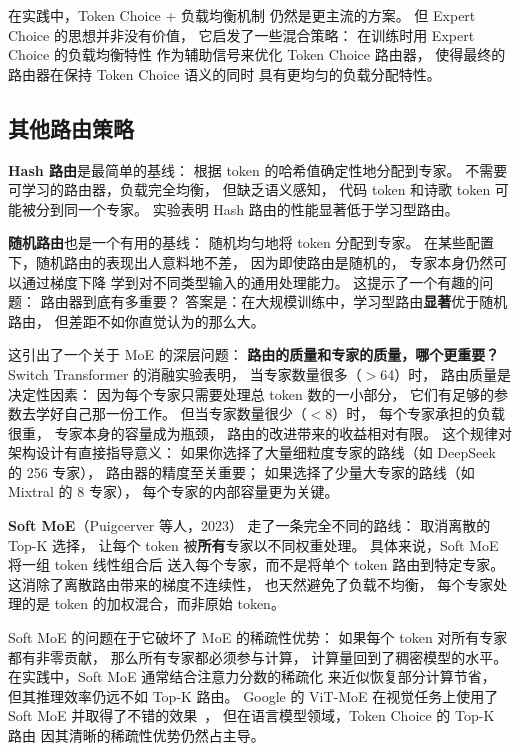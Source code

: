 在实践中，Token Choice + 负载均衡机制
仍然是更主流的方案。
但 Expert Choice 的思想并非没有价值，
它启发了一些混合策略：
在训练时用 Expert Choice 的负载均衡特性
作为辅助信号来优化 Token Choice 路由器，
使得最终的路由器在保持 Token Choice 语义的同时
具有更均匀的负载分配特性。

\subsection{其他路由策略}

\textbf{Hash 路由}是最简单的基线：
根据 token 的哈希值确定性地分配到专家。
不需要可学习的路由器，负载完全均衡，
但缺乏语义感知，
代码 token 和诗歌 token 可能被分到同一个专家。
实验表明 Hash 路由的性能显著低于学习型路由。

\textbf{随机路由}也是一个有用的基线：
随机均匀地将 token 分配到专家。
在某些配置下，随机路由的表现出人意料地不差，
因为即使路由是随机的，
专家本身仍然可以通过梯度下降
学到对不同类型输入的通用处理能力。
这提示了一个有趣的问题：
路由器到底有多重要？
答案是：在大规模训练中，学习型路由\textbf{显著}优于随机路由，
但差距不如你直觉认为的那么大。

这引出了一个关于 MoE 的深层问题：
\textbf{路由的质量和专家的质量，哪个更重要？}
Switch Transformer 的消融实验表明，
当专家数量很多（$>$64）时，
路由质量是决定性因素：
因为每个专家只需要处理总 token 数的一小部分，
它们有足够的参数去学好自己那一份工作。
但当专家数量很少（$<$8）时，
每个专家承担的负载很重，
专家本身的容量成为瓶颈，
路由的改进带来的收益相对有限。
这个规律对架构设计有直接指导意义：
如果你选择了大量细粒度专家的路线（如 DeepSeek 的 256 专家），
路由器的精度至关重要；
如果选择了少量大专家的路线（如 Mixtral 的 8 专家），
每个专家的内部容量更为关键。

\textbf{Soft MoE}（Puigcerver 等人，2023）%
走了一条完全不同的路线：
取消离散的 Top-K 选择，
让每个 token 被\textbf{所有}专家以不同权重处理。
具体来说，Soft MoE 将一组 token 线性组合后
送入每个专家，而不是将单个 token 路由到特定专家。
这消除了离散路由带来的梯度不连续性，
也天然避免了负载不均衡，
每个专家处理的是 token 的加权混合，而非原始 token。

Soft MoE 的问题在于它破坏了 MoE 的稀疏性优势：
如果每个 token 对所有专家都有非零贡献，
那么所有专家都必须参与计算，
计算量回到了稠密模型的水平。
在实践中，Soft MoE 通常结合注意力分数的稀疏化
来近似恢复部分计算节省，
但其推理效率仍远不如 Top-K 路由。
Google 的 ViT-MoE 在视觉任务上使用了 Soft MoE
并取得了不错的效果~\cite{puigcerver2024softmoe}，
但在语言模型领域，Token Choice 的 Top-K 路由
因其清晰的稀疏性优势仍然占主导。

